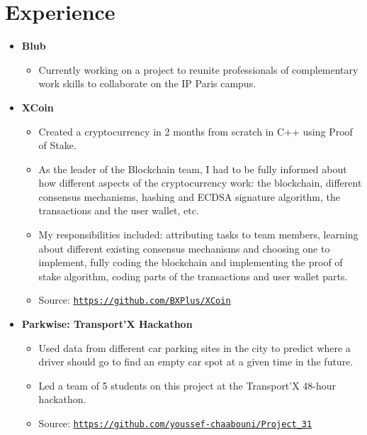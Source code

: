 \documentclass[letterpaper,11pt]{article}
\newcommand{\resumeItem}[2]{
  \item\small{
    \textbf{#1}{#2 \vspace{-2pt}}
  }
}
\newcommand{\resumeSmallSubheading}[1]{
  \item
    \textbf{#1}\vspace{-5pt}
}
\newcommand{\resumeSubHeadingListStart}{\begin{itemize}[leftmargin=*]}
\newcommand{\resumeSubHeadingListEnd}{\end{itemize}}
\newcommand{\resumeItemListStart}{\begin{itemize}}
\newcommand{\resumeItemListEnd}{\end{itemize}\vspace{-5pt}}
\begin{document}
\section{Experience}
  \resumeSubHeadingListStart
    \resumeSmallSubheading{Blub}
      \resumeItemListStart
        \resumeItem{}
          {Currently working on a project to reunite professionals of complementary work skills to collaborate on the IP Paris campus.}
      \resumeItemListEnd
    \resumeSmallSubheading{XCoin}
      \resumeItemListStart
        \resumeItem{}
          {Created a cryptocurrency in 2 months from scratch in C++ using Proof of Stake.}
        \resumeItem{}
          {As the leader of the Blockchain team, I had to be fully informed about how different aspects of the cryptocurrency work: the blockchain, different consensus mechanisms, hashing and ECDSA signature algorithm, the transactions and the user wallet, etc.}
        \resumeItem{}
          {My responsibilities included: attributing tasks to team members, learning about different existing consensus mechanisms and choosing one to implement, fully coding the blockchain and implementing the proof of stake algorithm, coding parts of the transactions and user wallet parts.}
        \resumeItem{}
          {Source: \texttt{\underline{\href{https://github.com/BXPlus/XCoin}{https://github.com/BXPlus/XCoin}}}}
      \resumeItemListEnd
    \resumeSmallSubheading{Parkwise: Transport'X Hackathon}
      \resumeItemListStart
        \resumeItem{}
          {Used data from different car parking sites in the city to predict where a driver should go to find an empty car spot at a given time in the future.}
        \resumeItem{}
          {Led a team of 5 students on this project at the Transport'X 48-hour hackathon.}
        \resumeItem{}
          {Source: \texttt{\underline{\href{https://github.com/youssef-chaabouni/Project_31}{https://github.com/youssef-chaabouni/Project\_31}}}}
      \resumeItemListEnd

  \resumeSubHeadingListEnd


\end{document}
